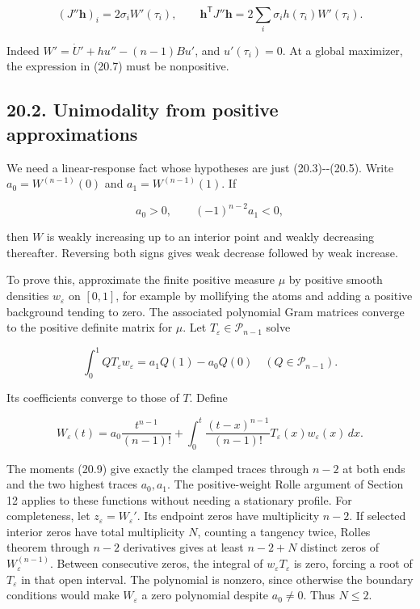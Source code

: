 \documentclass[11pt]{article}
\begin{document}
\[
(J''\mathbf h)_i=2\sigma_iW'(\tau_i),\qquad
\mathbf h^{\mathsf T}J''\mathbf h
=2\sum_i\sigma_i h(\tau_i)W'(\tau_i).
\tag{20.7}
\]

Indeed \(W'=\dot U'+hu''-(n-1)Bu'\), and \(u'(\tau_i)=0\). At a global
maximizer, the expression in (20.7) must be nonpositive.

\subsection{20.2. Unimodality from positive
approximations}\label{unimodality-from-positive-approximations}

We need a linear-response fact whose hypotheses are just
(20.3)-\/-(20.5). Write \(a_0=W^{(n-1)}(0)\) and \(a_1=W^{(n-1)}(1)\).
If

\[
a_0>0,\qquad (-1)^{n-2}a_1<0,
\tag{20.8}
\]

then \(W\) is weakly increasing up to an interior point and weakly
decreasing thereafter. Reversing both signs gives weak decrease followed
by weak increase.

To prove this, approximate the finite positive measure \(\mu\) by
positive smooth densities \(w_\varepsilon\) on \([0,1]\), for example by
mollifying the atoms and adding a positive background tending to zero.
The associated polynomial Gram matrices converge to the positive
definite matrix for \(\mu\). Let \(T_\varepsilon\in\mathcal P_{n-1}\)
solve

\[
\int_0^1 QT_\varepsilon w_\varepsilon
=a_1Q(1)-a_0Q(0)\quad(Q\in\mathcal P_{n-1}).
\tag{20.9}
\]

Its coefficients converge to those of \(T\). Define

\[
W_\varepsilon(t)=a_0\frac{t^{n-1}}{(n-1)!}
+\int_0^t\frac{(t-x)^{n-1}}{(n-1)!}
T_\varepsilon(x)w_\varepsilon(x)\,dx.
\tag{20.10}
\]

The moments (20.9) give exactly the clamped traces through \(n-2\) at
both ends and the two highest traces \(a_0,a_1\). The positive-weight
Rolle argument of Section 12 applies to these functions without needing
a stationary profile. For completeness, let
\(z_\varepsilon=W_\varepsilon'\). Its endpoint zeros have multiplicity
\(n-2\). If selected interior zeros have total multiplicity \(N\),
counting a tangency twice, Rolle\textquotesingle s theorem through
\(n-2\) derivatives gives at least \(n-2+N\) distinct zeros of
\(W_\varepsilon^{(n-1)}\). Between consecutive zeros, the integral of
\(w_\varepsilon T_\varepsilon\) is zero, forcing a root of
\(T_\varepsilon\) in that open interval. The polynomial is nonzero,
since otherwise the boundary conditions would make \(W_\varepsilon\) a
zero polynomial despite \(a_0\ne0\). Thus \(N\le2\).
\end{document}
